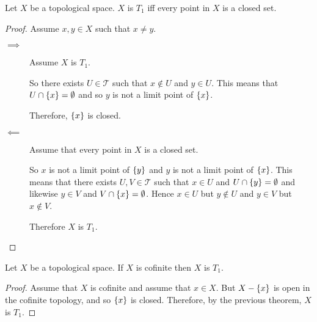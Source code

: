 \documentclass[letterpaper,12pt,fleqn]{article}
\newcommand{\T}{\mathscr{T}}
\begin{document}
\begin{theorem}[4.1]
  Let \(X\) be a topological space.  \(X\) is \(T_1\) iff every point in \(X\) is a closed set.
\end{theorem}

\begin{proof}
  Assume \(x,y\in X\) such that \(x\ne y\).

  \begin{description}
  \item[\(\implies\)] Assume \(X\) is \(T_1\).

    So there exists \(U\in\T\) such that \(x\notin U\) and \(y\in U\).  This means that \(U\cap\{x\}=\emptyset\)
    and so \(y\) is not a limit point of \(\{x\}\).

    Therefore, \(\{x\}\) is closed.

  \item[\(\impliedby\)] Assume that every point in \(X\) is a closed set.

    So \(x\) is not a limit point of \(\{y\}\) and \(y\) is not a limit point of \(\{x\}\).  This means that
    there exists \(U,V\in\T\) such that \(x\in U\) and \(U\cap\{y\}=\emptyset\) and likewise \(y\in V\) and
    \(V\cap\{x\}=\emptyset\).  Hence \(x\in U\) but \(y\notin U\) and \(y\in V\) but \(x\notin V\).

    Therefore \(X\) is \(T_1\).
  \end{description}
\end{proof}

\begin{theorem}[Exercise 4.2]
  Let \(X\) be a topological space.  If \(X\) is cofinite then \(X\) is \(T_1\).
\end{theorem}

\begin{proof}
  Assume that \(X\) is cofinite and assume that \(x\in X\).  But \(X-\{x\}\) is open in the cofinite topology, and
  so \(\{x\}\) is closed.  Therefore, by the previous theorem, \(X\) is \(T_1\).
\end{proof}
\end{document}
